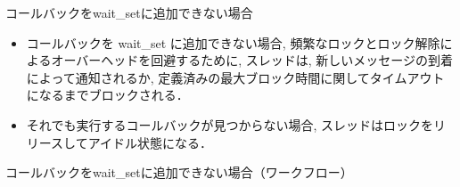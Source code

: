 \begin{frame}{コールバックをwait\_setに追加できない場合}
    \begin{itemize}
        \item コールバックを wait\_set に追加できない場合, 頻繁なロックとロック解除によるオーバーヘッドを回避するために, スレッドは, 新しいメッセージの到着によって通知されるか, 定義済みの最大ブロック時間に関してタイムアウトになるまでブロックされる．
        \item それでも実行するコールバックが見つからない場合, スレッドはロックをリリースしてアイドル状態になる．
    \end{itemize}
\end{frame}

\begin{frame}{コールバックをwait\_setに追加できない場合（ワークフロー）}
    \centering
    \vspace{\headerheight}
\end{frame}
